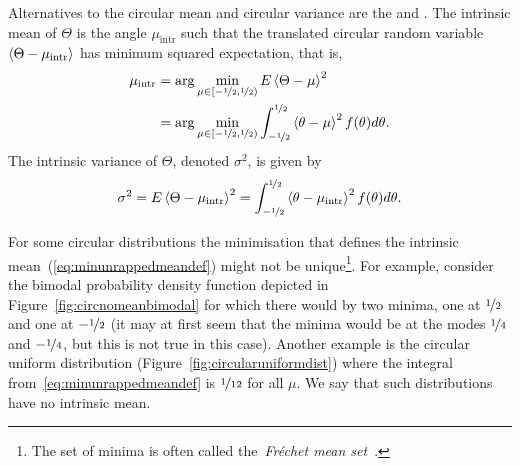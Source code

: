 \documentclass[journal]{IEEEtran}
\begin{document}
Alternatives to the circular mean and circular variance are the  and .  
The intrinsic mean of $\Theta$ is the angle $\mu_{\text{intr}}$ such that the translated circular random variable $\left< \Theta - \mu_{\text{intr}} \right>$ has minimum squared expectation, that is,
\begin{align}
\mu_{\text{intr}}  &= \arg \min_{\mu \in [-\nicefrac{1}{2}, \nicefrac{1}{2})}E\fracpart{\Theta - \mu}^2 \nonumber \\
&= \arg \min_{\mu \in [-\nicefrac{1}{2}, \nicefrac{1}{2})}\int_{-\nicefrac{1}{2}}^{\nicefrac{1}{2}}\fracpart{\theta - \mu}^2f(\theta) d\theta. \label{eq:minunrappedmeandef}
\end{align}
The intrinsic variance of $\Theta$, denoted $\sigma^2$, is given by 
\[
\sigma^2 = E\left< \Theta - \mu_{\text{intr}} \right>^2 = \int_{-\nicefrac{1}{2}}^{\nicefrac{1}{2}}\left< \theta - \mu_{\text{intr}} \right>^2f(\theta) d\theta.
\]

For some circular distributions the minimisation that defines the intrinsic mean~(\ref{eq:minunrappedmeandef}) might not be unique\footnote{The set of minima is often called the~\emph{Fr\'{e}chet mean set}~\cite{Bhattacharya_int_ext_means_2003,Bhattacharya_int_ext_means_2005}.}.  For example, consider the bimodal probability density function depicted in Figure~\ref{fig:circnomeanbimodal} for which there would by two minima, one at $\nicefrac{1}{2}$ and one at $-\nicefrac{1}{2}$ (it may at first seem that the minima would be at the modes $\nicefrac{1}{4}$ and $-\nicefrac{1}{4}$, but this is not true in this case).  Another example is the circular uniform distribution (Figure~\ref{fig:circularuniformdist}) where the integral from~\eqref{eq:minunrappedmeandef} is $\nicefrac{1}{12}$ for all $\mu$.  We say that such distributions have no intrinsic mean.
\end{document}
